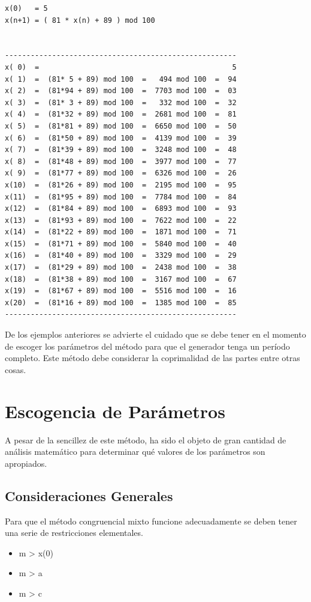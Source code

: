 \begin{verbatim}
x(0)   = 5
x(n+1) = ( 81 * x(n) + 89 ) mod 100


------------------------------------------------------
x( 0)  =                                             5 
x( 1)  =  (81* 5 + 89) mod 100  =   494 mod 100  =  94
x( 2)  =  (81*94 + 89) mod 100  =  7703 mod 100  =  03
x( 3)  =  (81* 3 + 89) mod 100  =   332 mod 100  =  32
x( 4)  =  (81*32 + 89) mod 100  =  2681 mod 100  =  81
x( 5)  =  (81*81 + 89) mod 100  =  6650 mod 100  =  50
x( 6)  =  (81*50 + 89) mod 100  =  4139 mod 100  =  39
x( 7)  =  (81*39 + 89) mod 100  =  3248 mod 100  =  48
x( 8)  =  (81*48 + 89) mod 100  =  3977 mod 100  =  77
x( 9)  =  (81*77 + 89) mod 100  =  6326 mod 100  =  26
x(10)  =  (81*26 + 89) mod 100  =  2195 mod 100  =  95
x(11)  =  (81*95 + 89) mod 100  =  7784 mod 100  =  84
x(12)  =  (81*84 + 89) mod 100  =  6893 mod 100  =  93
x(13)  =  (81*93 + 89) mod 100  =  7622 mod 100  =  22
x(14)  =  (81*22 + 89) mod 100  =  1871 mod 100  =  71
x(15)  =  (81*71 + 89) mod 100  =  5840 mod 100  =  40
x(16)  =  (81*40 + 89) mod 100  =  3329 mod 100  =  29
x(17)  =  (81*29 + 89) mod 100  =  2438 mod 100  =  38
x(18)  =  (81*38 + 89) mod 100  =  3167 mod 100  =  67
x(19)  =  (81*67 + 89) mod 100  =  5516 mod 100  =  16
x(20)  =  (81*16 + 89) mod 100  =  1385 mod 100  =  85
------------------------------------------------------
\end{verbatim}

De los ejemplos anteriores se advierte el cuidado que se debe tener en el momento de escoger los parámetros del método para que el generador tenga un período completo. Este método debe considerar la coprimalidad de las partes entre otras cosas.




\section{Escogencia de Parámetros}


A pesar de la sencillez de este método, ha sido el objeto de gran cantidad de análisis matemático para determinar qué valores de los parámetros son apropiados.


\subsection{ Consideraciones Generales}



Para que el método congruencial mixto funcione adecuadamente se deben tener una serie de restricciones elementales.
\begin{itemize}
\item m > x(0)
\item m > a
\item m > c
\end{itemize}


